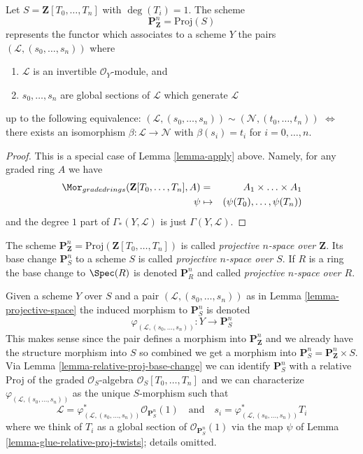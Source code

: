 \begin{lemma}
\label{lemma-projective-space}
Let $S = \mathbf{Z}[T_0, \ldots, T_n]$ with $\deg(T_i) = 1$.
The scheme
$$
\mathbf{P}^n_{\mathbf{Z}} = \text{Proj}(S)
$$
represents the functor which associates to a scheme $Y$ the pairs
$(\mathcal{L}, (s_0, \ldots, s_n))$ where
\begin{enumerate}
\item $\mathcal{L}$ is an invertible $\mathcal{O}_Y$-module, and
\item $s_0, \ldots, s_n$ are global sections of $\mathcal{L}$
which generate $\mathcal{L}$
\end{enumerate}
up to the following equivalence:
$(\mathcal{L}, (s_0, \ldots, s_n)) \sim
(\mathcal{N}, (t_0, \ldots, t_n))$ $\Leftrightarrow$ there exists
an isomorphism $\beta : \mathcal{L} \to \mathcal{N}$
with $\beta(s_i) = t_i$ for $i = 0, \ldots, n$.
\end{lemma}

\begin{proof}
This is a special case of Lemma \ref{lemma-apply} above.
Namely, for any graded ring $A$ we have
\begin{eqnarray*}
\Mor_{graded rings}(\mathbf{Z}[T_0, \ldots, T_n], A)
& = &
A_1 \times \ldots \times A_1 \\
\psi & \mapsto & (\psi(T_0), \ldots, \psi(T_n))
\end{eqnarray*}
and the degree $1$ part of $\Gamma_*(Y, \mathcal{L})$ is
just $\Gamma(Y, \mathcal{L})$.
\end{proof}

\begin{definition}
\label{definition-projective-space}
The scheme
$\mathbf{P}^n_{\mathbf{Z}} = \text{Proj}(\mathbf{Z}[T_0, \ldots, T_n])$
is called {\it projective $n$-space over $\mathbf{Z}$}.
Its base change $\mathbf{P}^n_S$ to a scheme $S$ is called
{\it projective $n$-space over $S$}. If $R$ is a ring the base change
to $\Spec(R)$ is denoted $\mathbf{P}^n_R$ and called
{\it projective $n$-space over $R$}.
\end{definition}

\noindent
Given a scheme $Y$ over $S$
and a pair $(\mathcal{L}, (s_0, \ldots, s_n))$ as in
Lemma \ref{lemma-projective-space}
the induced morphism to $\mathbf{P}^n_S$ is denoted
$$
\varphi_{(\mathcal{L}, (s_0, \ldots, s_n))} :
Y \longrightarrow \mathbf{P}^n_S
$$
This makes sense since the pair defines a morphism into
$\mathbf{P}^n_{\mathbf{Z}}$ and we already have the structure
morphism into $S$ so combined we get a morphism into
$\mathbf{P}^n_S = \mathbf{P}^n_{\mathbf{Z}} \times S$.
Via Lemma \ref{lemma-relative-proj-base-change}
we can identify $\mathbf{P}^n_S$ with a relative Proj of
the graded $\mathcal{O}_S$-algebra $\mathcal{O}_S[T_0, \ldots, T_n]$
and we can characterize $\varphi_{(\mathcal{L}, (s_0, \ldots, s_n))}$
as the unique $S$-morphism such that
$$
\mathcal{L} =
\varphi_{(\mathcal{L}, (s_0, \ldots, s_n))}^*\mathcal{O}_{\mathbf{P}^n_S}(1)
\quad
\text{and}
\quad
s_i = \varphi_{(\mathcal{L}, (s_0, \ldots, s_n))}^*T_i
$$
where we think of $T_i$ as a global section of
$\mathcal{O}_{\mathbf{P}^n_S}(1)$ via the map $\psi$ of
Lemma \ref{lemma-glue-relative-proj-twists}; details omitted.

